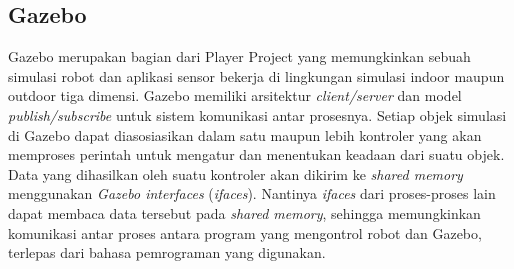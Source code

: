 \subsection{Gazebo}
\label{subsec:gazebo}

Gazebo \citep{koenig2004} merupakan bagian dari Player Project \citep{gerkey2003} yang memungkinkan sebuah simulasi robot dan aplikasi sensor bekerja di lingkungan simulasi indoor maupun outdoor tiga dimensi.
Gazebo memiliki arsitektur \emph{client/server} dan model \emph{publish/subscribe} untuk sistem komunikasi antar prosesnya.
Setiap objek simulasi di Gazebo dapat diasosiasikan dalam satu maupun lebih kontroler yang akan memproses perintah untuk mengatur dan menentukan keadaan dari suatu objek.
Data yang dihasilkan oleh suatu kontroler akan dikirim ke \emph{shared memory} menggunakan \emph{Gazebo interfaces} (\emph{ifaces}).
Nantinya \emph{ifaces} dari proses-proses lain dapat membaca data tersebut pada \emph{shared memory}, sehingga memungkinkan komunikasi antar proses antara program yang mengontrol robot dan Gazebo, terlepas dari bahasa pemrograman yang digunakan.
